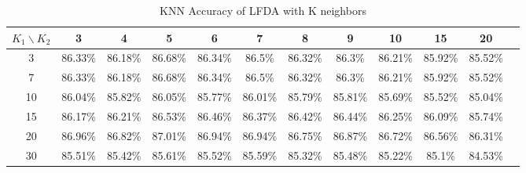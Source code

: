 \begin{table}[htbp]
    \centering
    \caption{KNN Accuracy of LFDA with K neighbors}
    \scriptsize
    \begin{tabular}{@{}cccccccccccc@{}}
    \toprule
    $K_1 \backslash K_2$ & 3 & 4 & 5 & 6 & 7 & 8 & 9 & 10 & 15 & 20 \\ \midrule
    3 & 86.33\% & 86.18\% & 86.68\% & 86.34\% & 86.5\% & 86.32\% & 86.3\% & 86.21\% & 85.92\% & 85.52\% \\
    7 & 86.33\% & 86.18\% & 86.68\% & 86.34\% & 86.5\% & 86.32\% & 86.3\% & 86.21\% & 85.92\% & 85.52\% \\
    10 & 86.04\% & 85.82\% & 86.05\% & 85.77\% & 86.01\% & 85.79\% & 85.81\% & 85.69\% & 85.52\% & 85.04\% \\
    15 & 86.17\% & 86.21\% & 86.53\% & 86.46\% & 86.37\% & 86.42\% & 86.44\% & 86.25\% & 86.09\% & 85.74\% \\
    20 & 86.96\% & 86.82\% & 87.01\% & 86.94\% & 86.94\% & 86.75\% & 86.87\% & 86.72\% & 86.56\% & 86.31\% \\
    30 & 85.51\% & 85.42\% & 85.61\% & 85.52\% & 85.59\% & 85.32\% & 85.48\% & 85.22\% & 85.1\% & 84.53\% \\
    \bottomrule
    \end{tabular}
    \label{tab:lfda_k}
\end{table}
